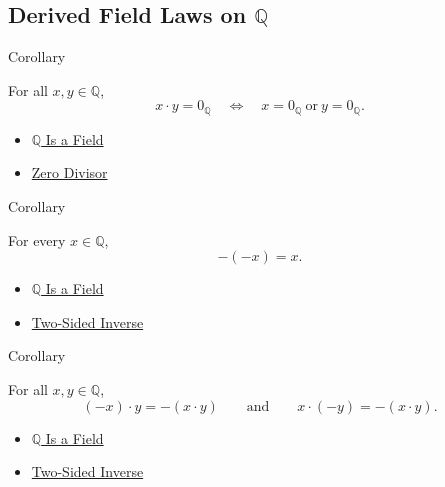 \subsection*{\texorpdfstring{Derived Field Laws on $\mathbb{Q}$}{Derived Field Laws on Q}}

\begin{corollarybox}{Corollary}
\begin{corollary}
\label{cor:zero-product-on-q}
For all $x,y\in\mathbb{Q}$,
\[
x\cdot y=0_{\mathbb{Q}}
\quad\Longleftrightarrow\quad
x=0_{\mathbb{Q}}\ \text{or}\ y=0_{\mathbb{Q}}.
\]
\end{corollary}
\end{corollarybox}

\begin{dependencies}
\begin{itemize}
  \item \hyperref[thm:q-is-a-field]{$\mathbb{Q}$ Is a Field}
  \item \hyperref[def:zero-divisor]{Zero Divisor}
\end{itemize}
\end{dependencies}

\begin{corollarybox}{Corollary}
\begin{corollary}
\label{cor:double-negation-on-q}
For every $x\in\mathbb{Q}$,
\[
-(-x)=x.
\]
\end{corollary}
\end{corollarybox}

\begin{dependencies}
\begin{itemize}
  \item \hyperref[thm:q-is-a-field]{$\mathbb{Q}$ Is a Field}
  \item \hyperref[def:two-sided-inverse]{Two-Sided Inverse}
\end{itemize}
\end{dependencies}

\begin{corollarybox}{Corollary}
\begin{corollary}
\label{cor:negation-of-product-on-q}
For all $x,y\in\mathbb{Q}$,
\[
(-x)\cdot y=-(x\cdot y)
\qquad\text{and}\qquad
x\cdot(-y)=-(x\cdot y).
\]
\end{corollary}
\end{corollarybox}

\begin{dependencies}
\begin{itemize}
  \item \hyperref[thm:q-is-a-field]{$\mathbb{Q}$ Is a Field}
  \item \hyperref[def:two-sided-inverse]{Two-Sided Inverse}
\end{itemize}
\end{dependencies}

